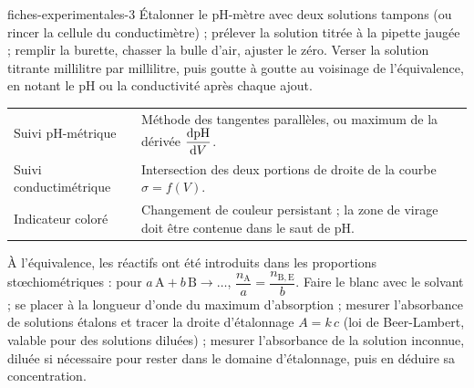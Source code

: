 \begin{blocEdition}{fiches-experimentales-3}
\fontsize{10}{13.5}\selectfont
\label{figedition-fiches-3}
Étalonner le pH-mètre avec deux solutions tampons (ou rincer la cellule du conductimètre) ; prélever la solution titrée à
la pipette jaugée ; remplir la burette, chasser la bulle d'air, ajuster le zéro. Verser la solution titrante millilitre
par millilitre, puis goutte à goutte au voisinage de l'équivalence, en notant le pH ou la conductivité après chaque ajout.
\begin{tabularx}{\linewidth}{@{}p{38mm}Y@{}}\toprule
Suivi pH-métrique & Méthode des tangentes parallèles, ou maximum de la dérivée $\dfrac{\mathrm{d}\mathrm{pH}}{\mathrm{d}V}$. \\[1mm]
Suivi conductimétrique & Intersection des deux portions de droite de la courbe $\sigma=f(V)$. \\[1mm]
Indicateur coloré & Changement de couleur persistant ; la zone de virage doit être contenue dans le saut de pH. \\\bottomrule
\end{tabularx}\par\smallskip
À l'équivalence, les réactifs ont été introduits dans les proportions stœchiométriques : pour $a\,\mathrm{A}+b\,\mathrm{B}\to\ldots$,
$\dfrac{n_\mathrm{A}}{a}=\dfrac{n_{\mathrm{B},\mathrm{E}}}{b}$.
Faire le blanc avec le solvant ; se placer à la longueur d'onde du maximum d'absorption ; mesurer l'absorbance de
solutions étalons et tracer la droite d'étalonnage $A=k\,c$ (loi de Beer-Lambert, valable pour des solutions diluées) ;
mesurer l'absorbance de la solution inconnue, diluée si nécessaire pour rester dans le domaine d'étalonnage, puis en
déduire sa concentration.
\end{blocEdition}

